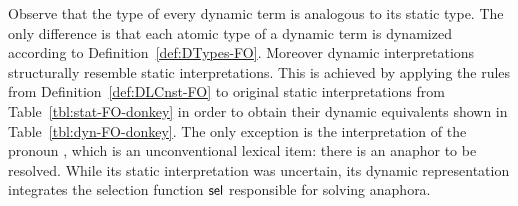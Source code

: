 Observe that the type of every dynamic term is analogous to its static type. The only difference is that each atomic type of a dynamic term is dynamized according to Definition~\ref{def:DTypes-FO}. Moreover dynamic interpretations structurally resemble static interpretations. This is achieved by applying the rules from Definition~\ref{def:DLCnst-FO} to original static interpretations from Table~\ref{tbl:stat-FO-donkey} in order to obtain their dynamic equivalents shown in Table~\ref{tbl:dyn-FO-donkey}. The only exception is the interpretation of the pronoun , which is an unconventional lexical item: there is an anaphor to be resolved. While its static interpretation was uncertain, its dynamic representation integrates the selection function $\mathsf{sel}$ responsible for solving anaphora.


